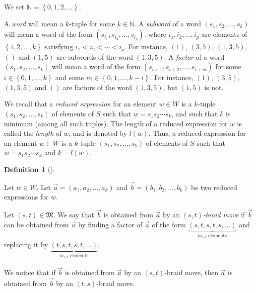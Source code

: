 \documentclass
[numbers=enddot,12pt,final,onecolumn,notitlepage,abstracton]{scrartcl}%
\theoremstyle{definition}
\newtheorem{defi}[theo]{Definition}
\newenvironment{definition}[1][]
{\begin{defi}[#1]\begin{leftbar}}
{\end{leftbar}\end{defi}}
\begin{document}
We set $\mathbb{N}=\left\{  0,1,2,\ldots\right\}  $.

A \emph{word} will mean a $k$-tuple for some $k\in\mathbb{N}$. A
\emph{subword} of a word $\left(  s_{1},s_{2},\ldots,s_{k}\right)  $ will mean
a word of the form $\left(  s_{i_{1}},s_{i_{2}},\ldots,s_{i_{p}}\right)  $,
where $i_{1},i_{2},\ldots,i_{p}$ are elements of $\left\{  1,2,\ldots
,k\right\}  $ satisfying $i_{1}<i_{2}<\cdots<i_{p}$. For instance, $\left(
1\right)  $, $\left(  3,5\right)  $, $\left(  1,3,5\right)  $, $\left(
{}\right)  $ and $\left(  1,5\right)  $ are subwords of the word $\left(
1,3,5\right)  $. A \emph{factor} of a word $\left(  s_{1},s_{2},\ldots
,s_{k}\right)  $ will mean a word of the form $\left(  s_{i+1},s_{i+2}%
,\ldots,s_{i+m}\right)  $ for some $i\in\left\{  0,1,\ldots,k\right\}  $ and
some $m\in\left\{  0,1,\ldots,k-i\right\}  $. For instance, $\left(  1\right)
$, $\left(  3,5\right)  $, $\left(  1,3,5\right)  $ and $\left(  {}\right)  $
are factors of the word $\left(  1,3,5\right)  $, but $\left(  1,5\right)  $
is not.

We recall that a \emph{reduced expression} for an element $w\in W$ is a
$k$-tuple $\left(  s_{1},s_{2},\ldots,s_{k}\right)  $ of elements of $S$ such
that $w=s_{1}s_{2}\cdots s_{k}$, and such that $k$ is minimum (among all such
tuples). The length of a reduced expression for $w$ is called the
\emph{length} of $w$, and is denoted by $l\left(  w\right)  $. Thus, a reduced
expression for an element $w\in W$ is a $k$-tuple $\left(  s_{1},s_{2}%
,\ldots,s_{k}\right)  $ of elements of $S$ such that $w=s_{1}s_{2}\cdots
s_{k}$ and $k=l\left(  w\right)  $.

\begin{definition}
\label{def.braid}Let $w\in W$. Let $\overrightarrow{a}=\left(  a_{1}%
,a_{2},\ldots,a_{k}\right)  $ and $\overrightarrow{b}=\left(  b_{1}%
,b_{2},\ldots,b_{k}\right)  $ be two reduced expressions for $w$.

Let $\left(  s,t\right)  \in\mathfrak{M}$. We say that $\overrightarrow{b}$ is
obtained from $\overrightarrow{a}$ by an $\left(  s,t\right)  $\emph{-braid
move} if $\overrightarrow{b}$ can be obtained from $\overrightarrow{a}$ by
finding a factor of $\overrightarrow{a}$ of the form $\underbrace{\left(
s,t,s,t,s,\ldots\right)  }_{m_{s,t}\text{ elements}}$ and replacing it by
$\underbrace{\left(  t,s,t,s,t,\ldots\right)  }_{m_{s,t}\text{ elements}}$.

We notice that if $\overrightarrow{b}$ is obtained from $\overrightarrow{a}$
by an $\left(  s,t\right)  $-braid move, then $\overrightarrow{a}$ is obtained
from $\overrightarrow{b}$ by an $\left(  t,s\right)  $-braid move.
\end{definition}
\end{document}
